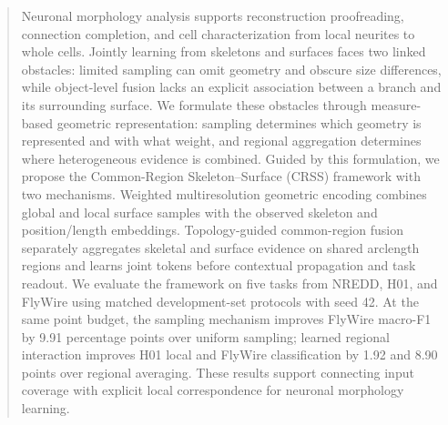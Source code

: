 \begin{abstract}
Neuronal morphology analysis supports reconstruction proofreading, connection completion, and cell characterization from local neurites to whole cells. Jointly learning from skeletons and surfaces faces two linked obstacles: limited sampling can omit geometry and obscure size differences, while object-level fusion lacks an explicit association between a branch and its surrounding surface. We formulate these obstacles through measure-based geometric representation: sampling determines which geometry is represented and with what weight, and regional aggregation determines where heterogeneous evidence is combined. Guided by this formulation, we propose the Common-Region Skeleton--Surface (CRSS) framework with two mechanisms. Weighted multiresolution geometric encoding combines global and local surface samples with the observed skeleton and position/length embeddings. Topology-guided common-region fusion separately aggregates skeletal and surface evidence on shared arclength regions and learns joint tokens before contextual propagation and task readout. We evaluate the framework on five tasks from NREDD, H01, and FlyWire using matched development-set protocols with seed 42. At the same point budget, the sampling mechanism improves FlyWire macro-F1 by 9.91 percentage points over uniform sampling; learned regional interaction improves H01 local and FlyWire classification by 1.92 and 8.90 points over regional averaging. These results support connecting input coverage with explicit local correspondence for neuronal morphology learning.
\end{abstract}
